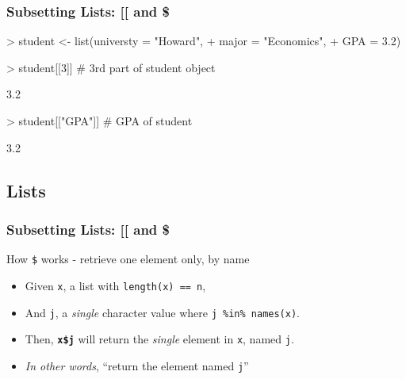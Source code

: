 \documentclass{beamer}
\newcommand{\R}[1]{\texttt{#1}}
\begin{document}
\begin{frame}[fragile]
\frametitle{Subsetting Lists: [[ and \$}

\begin{Schunk}
\begin{Sinput}
> student <- list(universty = "Howard", 
+                 major     = "Economics", 
+                 GPA       = 3.2)
\end{Sinput}
\end{Schunk}
\pause
\begin{Schunk}
\begin{Sinput}
> student[[3]]        # 3rd part of student object
\end{Sinput}
\end{Schunk}
\pause
\begin{Schunk}
\begin{Soutput}
[1] 3.2
\end{Soutput}
\end{Schunk}
\pause
\begin{Schunk}
\begin{Sinput}
> student[["GPA"]]    # GPA of student
\end{Sinput}
\end{Schunk}
\pause
\begin{Schunk}
\begin{Soutput}
[1] 3.2
\end{Soutput}
\end{Schunk}

\end{frame}

\subsection{Lists}
\begin{frame}[fragile]
\frametitle{Subsetting Lists: [[ and \$}


How \R{\$} works - retrieve one element only, by name
\begin{itemize}
\item Given \R{x}, a list with \R{length(x) == n},
\item And \R{j}, a \textit{single} character value where \R{j \%in\% names(x)}.
\item Then, \R{\textbf{x\$j}} will return the \textit{single} element in \R{x}, named \R{j}.
\item \textit{In other words}, ``return the element named \R{j}''
\end{itemize}


\end{frame}
\end{document}

